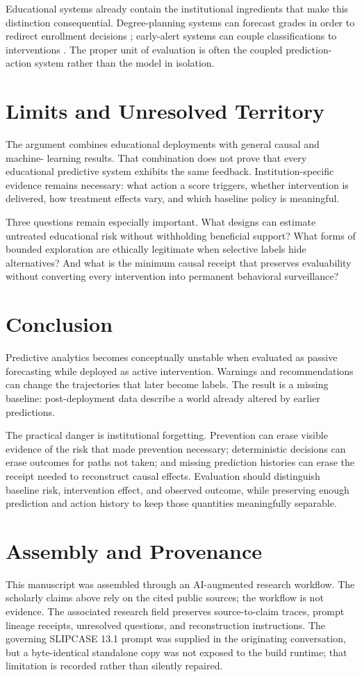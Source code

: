 \documentclass[11pt]{article}
\begin{document}
Educational systems already contain the institutional ingredients that make this
distinction consequential. Degree-planning systems can forecast grades in order to
redirect enrollment decisions \parencite{denley2013degreecompass}; early-alert
systems can couple classifications to interventions
\parencite{jayaprakash2014earlyalert}. The proper unit of evaluation is often the
coupled prediction-action system rather than the model in isolation.

\section{Limits and Unresolved Territory}
The argument combines educational deployments with general causal and machine-
learning results. That combination does not prove that every educational predictive
system exhibits the same feedback. Institution-specific evidence remains necessary:
what action a score triggers, whether intervention is delivered, how treatment
effects vary, and which baseline policy is meaningful.

Three questions remain especially important. What designs can estimate untreated
educational risk without withholding beneficial support? What forms of bounded
exploration are ethically legitimate when selective labels hide alternatives? And
what is the minimum causal receipt that preserves evaluability without converting
every intervention into permanent behavioral surveillance?

\section{Conclusion}
Predictive analytics becomes conceptually unstable when evaluated as passive
forecasting while deployed as active intervention. Warnings and recommendations can
change the trajectories that later become labels. The result is a missing baseline:
post-deployment data describe a world already altered by earlier predictions.

The practical danger is institutional forgetting. Prevention can erase visible
evidence of the risk that made prevention necessary; deterministic decisions can
erase outcomes for paths not taken; and missing prediction histories can erase the
receipt needed to reconstruct causal effects. Evaluation should distinguish baseline
risk, intervention effect, and observed outcome, while preserving enough prediction
and action history to keep those quantities meaningfully separable.

\printbibliography
\appendix
\section{Assembly and Provenance}
This manuscript was assembled through an AI-augmented research workflow. The
scholarly claims above rely on the cited public sources; the workflow is not
evidence. The associated research field preserves source-to-claim traces, prompt
lineage receipts, unresolved questions, and reconstruction instructions. The
governing SLIPCASE 13.1 prompt was supplied in the originating conversation, but a
byte-identical standalone copy was not exposed to the build runtime; that limitation
is recorded rather than silently repaired.
\end{document}
